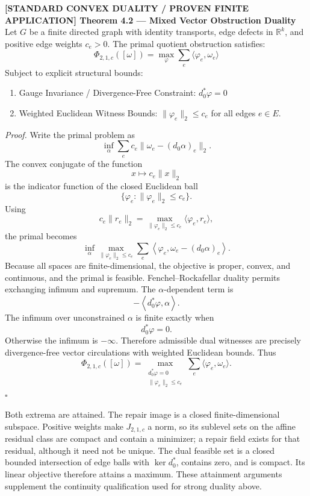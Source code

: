 \documentclass[
  11pt,
]{article}
\providecommand{\tightlist}{%
  \setlength{\itemsep}{0pt}\setlength{\parskip}{0pt}}
\providecommand{\tightlist}{%
  \setlength{\itemsep}{0pt}\setlength{\parskip}{0pt}}
\renewenvironment{quote}
  {\begin{leftbar}\small}
  {\end{leftbar}}
\begin{document}
\begin{quote}
\textbf{{[}STANDARD CONVEX DUALITY / PROVEN FINITE APPLICATION{]}
Theorem 4.2 --- Mixed Vector Obstruction Duality} Let \(G\) be a finite
directed graph with identity transports, edge defects in
\(\mathbb{R}^k\), and positive edge weights \(c_e>0\). The primal
quotient obstruction satisfies: \[
\Phi_{2,1,c}([\omega])
=
\max_\varphi \sum_e \langle \varphi_e, \omega_e \rangle
\] Subject to explicit structural bounds:

\begin{enumerate}
\def\labelenumi{\arabic{enumi}.}
\tightlist
\item
  Gauge Invariance / Divergence-Free Constraint: \(d_0^* \varphi = 0\)
\item
  Weighted Euclidean Witness Bounds: \(\|\varphi_e\|_2 \le c_e\) for all
  edges \(e \in E\).
\end{enumerate}

\emph{Proof.} Write the primal problem as \[
\inf_{\alpha}\sum_e c_e\|\omega_e-(d_0\alpha)_e\|_2.
\] The convex conjugate of the function \[
x\mapsto c_e\|x\|_2
\] is the indicator function of the closed Euclidean ball \[
\{\varphi_e:\|\varphi_e\|_2\le c_e\}.
\] Using \[
c_e\|r_e\|_2=
\max_{\|\varphi_e\|_2\le c_e}\langle\varphi_e,r_e\rangle,
\] the primal becomes \[
\inf_\alpha
\max_{\|\varphi_e\|_2\le c_e}
\sum_e
\left\langle\varphi_e,\omega_e-(d_0\alpha)_e\right\rangle.
\] Because all spaces are finite-dimensional, the objective is proper,
convex, and continuous, and the primal is feasible. Fenchel--Rockafellar
duality permits exchanging infimum and supremum. The
\(\alpha\)-dependent term is \[
-\left\langle d_0^*\varphi,\alpha\right\rangle.
\] The infimum over unconstrained \(\alpha\) is finite exactly when \[
d_0^*\varphi=0.
\] Otherwise the infimum is \(-\infty\). Therefore admissible dual
witnesses are precisely divergence-free vector circulations with
weighted Euclidean bounds. Thus \[
\Phi_{2,1,c}([\omega])=
\max_{\substack{d_0^*\varphi=0\\ \|\varphi_e\|_2\le c_e}}
\sum_e\langle\varphi_e,\omega_e\rangle.
\] \(\square\)
\end{quote}

Both extrema are attained. The repair image is a closed
finite-dimensional subspace. Positive weights make \(J_{2,1,c}\) a norm,
so its sublevel sets on the affine residual class are compact and
contain a minimizer; a repair field exists for that residual, although
it need not be unique. The dual feasible set is a closed bounded
intersection of edge balls with \(\ker d_0^*\), contains zero, and is
compact. Its linear objective therefore attains a maximum. These
attainment arguments supplement the continuity qualification used for
strong duality above.
\end{document}
